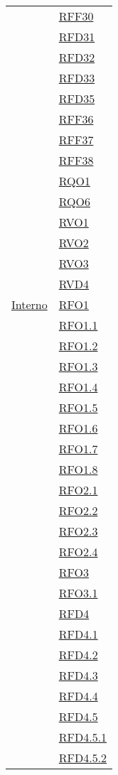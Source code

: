 \begin{longtable}{|>{\centering}m{5cm}|m{5cm}<{\centering}|}
& \hyperlink{RFF30}{RFF30}\\
& \hyperlink{RFD31}{RFD31}\\
& \hyperlink{RFD32}{RFD32}\\
& \hyperlink{RFD33}{RFD33}\\
& \hyperlink{RFD35}{RFD35}\\
& \hyperlink{RFF36}{RFF36}\\
& \hyperlink{RFF37}{RFF37}\\
& \hyperlink{RFF38}{RFF38}\\
& \hyperlink{RQO1}{RQO1}\\
& \hyperlink{RQO6}{RQO6}\\
& \hyperlink{RVO1}{RVO1}\\
& \hyperlink{RVO2}{RVO2}\\
& \hyperlink{RVO3}{RVO3}\\
& \hyperlink{RVD4}{RVD4}\\ \hline
\hyperlink{Interno}{Interno} & \hyperlink{RFO1}{RFO1}\\
& \hyperlink{RFO1.1}{RFO1.1}\\
& \hyperlink{RFO1.2}{RFO1.2}\\
& \hyperlink{RFO1.3}{RFO1.3}\\
& \hyperlink{RFO1.4}{RFO1.4}\\
& \hyperlink{RFO1.5}{RFO1.5}\\
& \hyperlink{RFO1.6}{RFO1.6}\\
& \hyperlink{RFO1.7}{RFO1.7}\\
& \hyperlink{RFO1.8}{RFO1.8}\\
& \hyperlink{RFO2.1}{RFO2.1}\\
& \hyperlink{RFO2.2}{RFO2.2}\\
& \hyperlink{RFO2.3}{RFO2.3}\\
& \hyperlink{RFO2.4}{RFO2.4}\\
& \hyperlink{RFO3}{RFO3}\\
& \hyperlink{RFO3.1}{RFO3.1}\\
& \hyperlink{RFD4}{RFD4}\\
& \hyperlink{RFD4.1}{RFD4.1}\\
& \hyperlink{RFD4.2}{RFD4.2}\\
& \hyperlink{RFD4.3}{RFD4.3}\\
& \hyperlink{RFD4.4}{RFD4.4}\\
& \hyperlink{RFD4.5}{RFD4.5}\\
& \hyperlink{RFD4.5.1}{RFD4.5.1}\\
& \hyperlink{RFD4.5.2}{RFD4.5.2}\\

\end{longtable}
